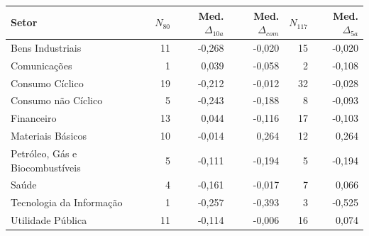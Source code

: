 \begin{tabular}{p{}rrrrr}
\toprule
Setor & $N_{80}$ & Med.$\Delta_{10a}$ & Med.$\Delta_{com}$ & $N_{117}$ & Med.$\Delta_{5a}$\\
\midrule
Bens Industriais & 11 & -0,268 & -0,020 & 15 & -0,020\\
Comunicações & 1 & 0,039 & -0,058 & 2 & -0,108\\
Consumo Cíclico & 19 & -0,212 & -0,012 & 32 & -0,028\\
Consumo não Cíclico & 5 & -0,243 & -0,188 & 8 & -0,093\\
Financeiro & 13 & 0,044 & -0,116 & 17 & -0,103\\
Materiais Básicos & 10 & -0,014 & 0,264 & 12 & 0,264\\
Petróleo, Gás e Biocombustíveis & 5 & -0,111 & -0,194 & 5 & -0,194\\
Saúde & 4 & -0,161 & -0,017 & 7 & 0,066\\
Tecnologia da Informação & 1 & -0,257 & -0,393 & 3 & -0,525\\
Utilidade Pública & 11 & -0,114 & -0,006 & 16 & 0,074\\
\bottomrule
\end{tabular}
